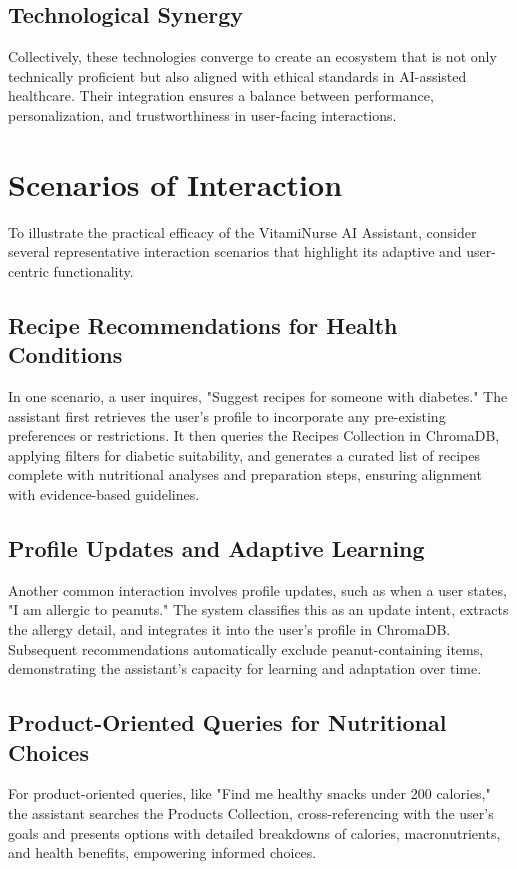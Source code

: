 \subsection{Technological Synergy}
Collectively, these technologies converge to create an ecosystem that is not only technically proficient but also aligned with ethical standards in AI-assisted healthcare. Their integration ensures a balance between performance, personalization, and trustworthiness in user-facing interactions.

\section{Scenarios of Interaction}
To illustrate the practical efficacy of the VitamiNurse AI Assistant, consider several representative interaction scenarios that highlight its adaptive and user-centric functionality.

\subsection{Recipe Recommendations for Health Conditions}
In one scenario, a user inquires, "Suggest recipes for someone with diabetes." The assistant first retrieves the user's profile to incorporate any pre-existing preferences or restrictions. It then queries the Recipes Collection in ChromaDB, applying filters for diabetic suitability, and generates a curated list of recipes complete with nutritional analyses and preparation steps, ensuring alignment with evidence-based guidelines.

\subsection{Profile Updates and Adaptive Learning}
Another common interaction involves profile updates, such as when a user states, "I am allergic to peanuts." The system classifies this as an update intent, extracts the allergy detail, and integrates it into the user's profile in ChromaDB. Subsequent recommendations automatically exclude peanut-containing items, demonstrating the assistant's capacity for learning and adaptation over time.

\subsection{Product-Oriented Queries for Nutritional Choices}
For product-oriented queries, like "Find me healthy snacks under 200 calories," the assistant searches the Products Collection, cross-referencing with the user's goals and presents options with detailed breakdowns of calories, macronutrients, and health benefits, empowering informed choices.

